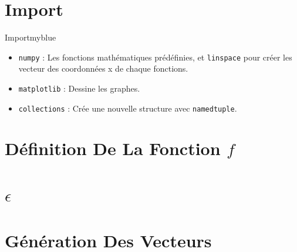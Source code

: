 \newpage
{}

\setcounter{section}{0}

\vspace{0.25cm}


\section{Import}
\begin{prettyBox}{Import}{myblue}
\begin{itemize}
    \item \texttt{numpy} : Les fonctions mathématiques prédéfinies, et \texttt{linspace} pour créer  
        les vecteur des coordonnées x de chaque fonctions.  
    \item \texttt{matplotlib} : Dessine les graphes.  
    \item \texttt{collections} : Crée une nouvelle structure avec \texttt{namedtuple}.  
\end{itemize}
\end{prettyBox}
\vspace{0.5cm}


\vspace{1cm}

\section{Définition De La Fonction \(f\)}


\vspace{1cm}
\section{\(\epsilon\)}


\vspace{1cm}
\section{Génération Des Vecteurs}


\newpage
